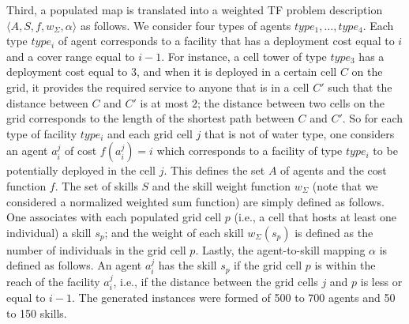 \documentclass[conference]{IEEEtran}
\theoremstyle{definition}
\begin{document}
Third, a populated map is translated into a weighted TF problem description
 $\langle A, S, f, w_\Sigma, \alpha\rangle$ as follows.
We consider four types of agents $type_1, \ldots, type_4$. 
Each type $type_i$ of agent corresponds to a facility that has a deployment cost
equal to $i$ and a cover range equal to $i - 1$. For instance, a cell tower 
of type $type_3$ has a deployment cost equal to $3$, and when it is
deployed in a certain cell $C$ on the grid, it provides the required service 
to anyone that is in a cell $C'$ such that the distance between
$C$ and $C'$ is at most $2$; the distance between two cells on the grid corresponds 
to the length of the shortest path
between $C$ and $C'$. So for each type of facility $type_i$ and each grid cell $j$ that is not of water type,
one considers an agent $a_i^j$ of cost $f(a_i^j) = i$ which corresponds to a 
facility of type $type_i$ to be potentially deployed in the cell $j$.
This defines the set $A$ of agents and the cost function $f$.
The set of skills $S$ and the skill weight function $w_\Sigma$ 
(note that we considered a normalized weighted sum function)
are simply defined as follows. One associates with each populated grid cell $p$ 
(i.e., a cell that hosts at least one individual) a skill $s_p$; and the weight 
of each skill $w_\Sigma(s_p)$ is defined as the number of individuals in the grid cell $p$.
Lastly, the agent-to-skill mapping $\alpha$ is defined as follows. An agent $a_i^j$ 
has the skill $s_p$ if the grid cell $p$ is within the reach of the facility $a_i^j$, 
i.e., if the distance between the grid cells $j$ and $p$ is less or equal to $i - 1$.
The generated instances were formed of 500 to 700 agents and 50 to 150 skills.
\end{document}
